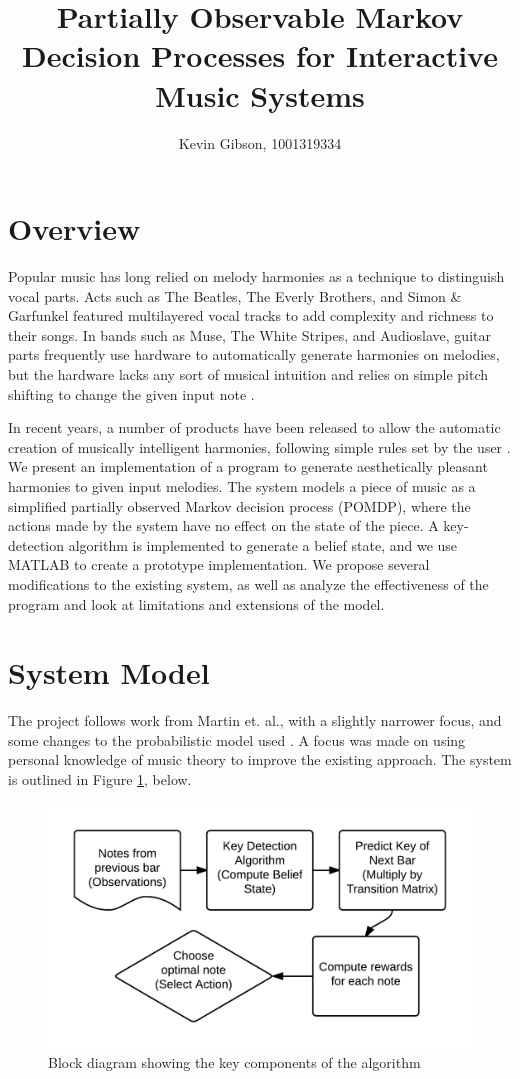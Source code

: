 \documentclass[11pt]{article} %
\title{Partially Observable Markov Decision Processes for Interactive Music Systems}
\author{Kevin Gibson, 1001319334}
\begin{document}
\maketitle

\section{Overview}
Popular music has long relied on melody harmonies as a technique to distinguish vocal parts. Acts such as The Beatles, The Everly Brothers, and Simon \& Garfunkel featured multilayered vocal tracks to add complexity and richness to their songs. In bands such as Muse, The White Stripes, and Audioslave, guitar parts frequently use hardware to automatically generate harmonies on melodies, but the hardware lacks any sort of musical intuition and relies on simple pitch shifting to change the given input note \cite{whammy}. 

In recent years, a number of products have been released to allow the automatic creation of musically intelligent harmonies, following simple rules set by the user \cite{live5}. We present an implementation of a program to generate aesthetically pleasant harmonies to given input melodies. The system models a piece of music as a simplified partially observed Markov decision process (POMDP), where the actions made by the system have no effect on the state of the piece. A key-detection algorithm is implemented to generate a belief state, and we use MATLAB to create a prototype implementation. We propose several modifications to the existing system, as well as analyze the effectiveness of the program and look at limitations and extensions of the model. 

\section{System Model}
The project follows work from Martin et. al., with a slightly narrower focus, and some changes to the probabilistic model used \cite{martin2010}. A focus was made on using personal knowledge of music theory to improve the existing approach. The system is outlined in Figure \ref{fig:blockdiagram}, below. %

\begin{figure}[h]
\centering
\includegraphics[resolution=300]{blockdiagram.png}
\caption{Block diagram showing the key components of the algorithm}
\label{fig:blockdiagram}
\end{figure}
\end{document}
